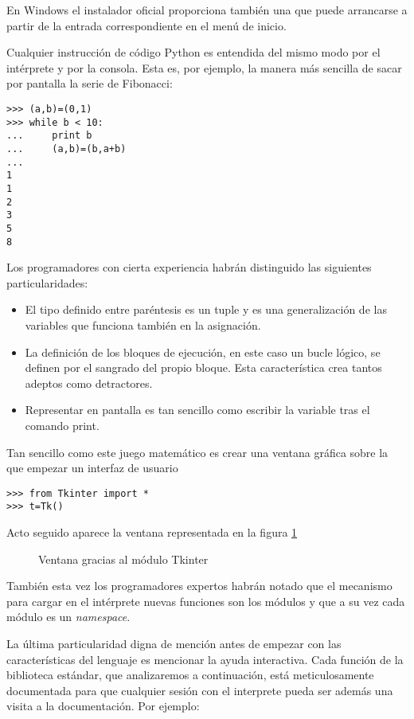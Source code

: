 \documentclass[a4paper,10pt]{article}
\begin{document}
En Windows el instalador oficial proporciona también una que puede
arrancarse a partir de la entrada correspondiente en el menú de
inicio.

Cualquier instrucción de código Python es entendida del mismo modo por
el intérprete y por la consola. Esta es, por ejemplo, la manera más
sencilla de sacar por pantalla la serie de Fibonacci:

\begin{lstlisting}
>>> (a,b)=(0,1)
>>> while b < 10:
...     print b
...     (a,b)=(b,a+b)
...
1
1
2
3
5
8
\end{lstlisting}

Los programadores con cierta experiencia habrán distinguido las
siguientes particularidades:

\begin{itemize}
\item El tipo definido entre paréntesis es un tuple y es una
  generalización de las variables que funciona también en la
  asignación.
\item La definición de los bloques de ejecución, en este caso un bucle
  lógico, se definen por el sangrado del propio bloque.  Esta
  característica crea tantos adeptos como detractores.
\item Representar en pantalla es tan sencillo como escribir la
  variable tras el comando print.
\end{itemize}

Tan sencillo como este juego matemático es crear una ventana gráfica
sobre la que empezar un interfaz de usuario

\begin{lstlisting}
>>> from Tkinter import *
>>> t=Tk()
\end{lstlisting}

Acto seguido aparece la ventana representada en la figura \ref{fig:tk}

\begin{figure}[h!]
\label{fig:tk}
  \centering
  \caption{Ventana gracias al módulo Tkinter}
\end{figure}

También esta vez los programadores expertos habrán notado que el
mecanismo para cargar en el intérprete nuevas funciones son los
módulos y que a su vez cada módulo es un \emph{namespace}.

La última particularidad digna de mención antes de empezar con las
características del lenguaje es mencionar la ayuda interactiva.  Cada
función de la biblioteca estándar, que analizaremos a continuación,
está meticulosamente documentada para que cualquier sesión con el
interprete pueda ser además una visita a la documentación.  Por
ejemplo:
\end{document}

